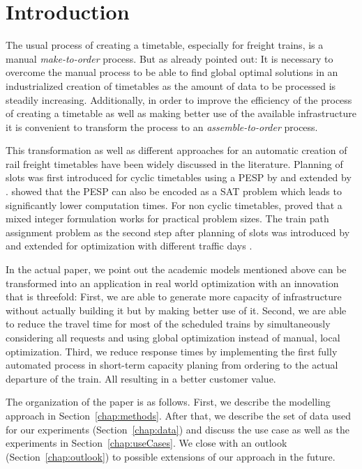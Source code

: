 \section{Introduction}
\label{chap:intro}
%
The usual process of creating a timetable, especially for freight trains, is a manual \emph{make-to-order} process. But as \cite{FP:2014} already pointed out: It is necessary to overcome the manual process to be able to find global optimal solutions in an industrialized creation of timetables as the amount of data to be processed is steadily increasing. Additionally, in order to improve the efficiency of the process of creating a timetable as well as making better use of the available infrastructure it is convenient to transform the process to an \emph{assemble-to-order} process.

This transformation as well as different approaches for an automatic creation of rail freight timetables have been widely discussed in the literature. Planning of slots was first introduced for cyclic timetables using a PESP by \cite{N:1998} and extended by \cite{O:2009}. \cite{G:2012} showed that the PESP can also be encoded as a SAT problem which leads to significantly lower computation times. For non cyclic timetables, \cite{G:2013} proved that a mixed integer formulation works for practical problem sizes. The train path assignment problem as the second step after planning of slots was introduced by \cite{NO:2014} and extended for optimization with different traffic days \cite{N:2015}. 

In the actual paper, we point out the academic models mentioned above can be transformed into an application in real world optimization with an innovation that is threefold: First, we are able to generate more capacity of infrastructure without actually building it but by making better use of it. Second, we are able to reduce the travel time for most of the scheduled trains by simultaneously considering all requests and using global optimization instead of manual, local optimization. Third, we reduce response times by implementing the first fully automated process in short-term capacity planing from ordering to the actual departure of the train. All resulting in a better customer value.

The organization of the paper is as follows. First, we describe the modelling approach in Section~\ref{chap:methods}. After that, we describe the set of data used for our experiments (Section~\ref{chap:data}) and discuss the use case as well as the experiments in Section~\ref{chap:useCases}. We close with an outlook (Section~\ref{chap:outlook}) to possible extensions of our approach in the future.